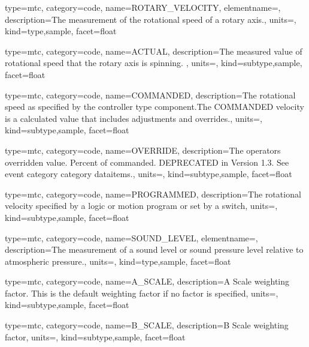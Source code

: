 {
  type=mtc,
  category=code,
  name={ROTARY\_VELOCITY},
  elementname=,
  description={The measurement of the rotational speed of a rotary axis.},
  units=,
  kind={type,sample},
  facet={\gls{float}}
}


{
  type=mtc,
  category=code,
  name={ACTUAL},
  description={The measured value of rotational speed that the rotary axis is spinning. },
  units=,
  kind={subtype,sample},
  facet={\gls{float}}
}


{
  type=mtc,
  category=code,
  name={COMMANDED},
  description={The rotational speed as specified by the \gls{controller} type component.The COMMANDED velocity is a calculated value that includes adjustments and overrides.},
  units=,
  kind={subtype,sample},
  facet={\gls{float}}
}


{
  type=mtc,
  category=code,
  name={OVERRIDE},
  description={The operators overridden value.  Percent of commanded. DEPRECATED in Version 1.3.   See \gls{event category} category \glspl{dataitem}.},
  units=,
  kind={subtype,sample},
  facet={\gls{float}}
}


{
  type=mtc,
  category=code,
  name={PROGRAMMED},
  description={The rotational velocity specified by a logic or motion program or set by a switch},
  units=,
  kind={subtype,sample},
  facet={\gls{float}}
}


{
  type=mtc,
  category=code,
  name={SOUND\_LEVEL},
  elementname=,
  description={The measurement of a sound level or sound pressure level relative to atmospheric pressure.},
  units=,
  kind={type,sample},
  facet={\gls{float}}
}


{
  type=mtc,
  category=code,
  name={A\_SCALE},
  description={A Scale weighting factor.   This is the default weighting factor if no factor is specified},
  units=,
  kind={subtype,sample},
  facet={\gls{float}}
}


{
  type=mtc,
  category=code,
  name={B\_SCALE},
  description={B Scale weighting factor},
  units=,
  kind={subtype,sample},
  facet={\gls{float}}
}


